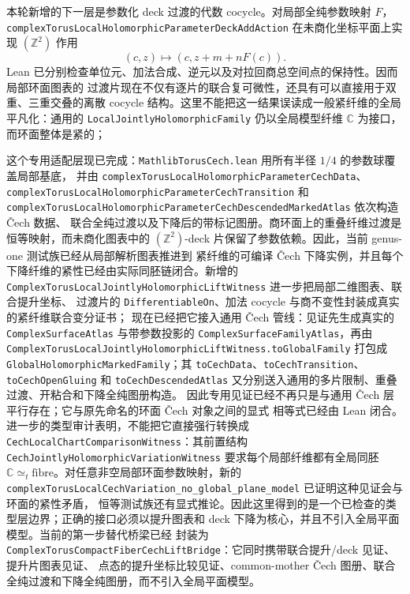 \documentclass[UTF8,fontset=none,a4paper,11pt]{ctexart}
\begin{document}
本轮新增的下一层是参数化 deck 过渡的代数 cocycle。对局部全纯参数映射 $F$，
\texttt{complexTorusLocalHolomorphicParameterDeckAddAction} 在未商化坐标平面上实现
\((\mathbb Z^2)\) 作用
\[
 (c,z)\longmapsto(c,z+m+nF(c)).
\]
Lean 已分别检查单位元、加法合成、逆元以及对拉回商总空间点的保持性。因而局部环面图表的
过渡片现在不仅有逐片的联合复可微性，还具有可以直接用于双重、三重交叠的离散 cocycle
结构。这里不能把这一结果误读成一般紧纤维的全局平凡化：通用的
\texttt{LocalJointlyHolomorphicFamily} 仍以全局模型纤维 \(\mathbb C\) 为接口，而环面整体是紧的；
\begin{sloppypar}
这个专用适配层现已完成：\texttt{MathlibTorusCech.lean} 用所有半径 $1/4$ 的参数球覆盖局部基底，
并由 \texttt{complexTorusLocalHolomorphicParameterCechData}、
\texttt{complexTorusLocalHolomorphicParameterCechTransition} 和
\texttt{complexTorusLocalHolomorphicParameterCechDescendedMarkedAtlas} 依次构造 Čech 数据、
联合全纯过渡以及下降后的带标记图册。商环面上的重叠纤维过渡是恒等映射，而未商化图表中的
\((\mathbb Z^2)\)-deck 片保留了参数依赖。因此，当前 genus-one 测试族已经从局部解析图表推进到
紧纤维的可编译 Čech 下降实例，并且每个下降纤维的紧性已经由实际同胚链闭合。新增的
\texttt{ComplexTorusLocalJointlyHolomorphicLiftWitness} 进一步把局部二维图表、联合提升坐标、
过渡片的 \texttt{DifferentiableOn}、加法 cocycle 与商不变性封装成真实的紧纤维联合变分证书；
现在已经把它接入通用 Čech 管线：见证先生成真实的
\texttt{ComplexSurfaceAtlas} 与带参数投影的
\texttt{ComplexSurfaceFamilyAtlas}，再由
\texttt{ComplexTorusLocalJointlyHolomorphicLiftWitness.toGlobalFamily} 打包成
\texttt{GlobalHolomorphicMarkedFamily}；其
\texttt{toCechData}、\texttt{toCechTransition}、\texttt{toCechOpenGluing} 和
\texttt{toCechDescendedAtlas} 又分别送入通用的多片限制、重叠过渡、开粘合和下降全纯图册构造。
因此专用见证已经不再只是与通用 Čech 层平行存在；它与原先命名的环面 Čech 对象之间的显式
相等式已经由 Lean 闭合。进一步的类型审计表明，不能把它直接强行转换成
\texttt{CechLocalChartComparisonWitness}：其前置结构
\texttt{CechJointlyHolomorphicVariationWitness} 要求每个局部纤维都有全局同胚
\(\mathbb C\simeq_t\text{fibre}\)。对任意非空局部环面参数映射，新的
\texttt{complexTorusLocalCechVariation\_no\_global\_plane\_model} 已证明这种见证会与环面的紧性矛盾，
恒等测试族还有显式推论。因此这里得到的是一个已检查的类型层边界；正确的接口必须以提升图表和
deck 下降为核心，并且不引入全局平面模型。当前的第一步替代桥梁已经
封装为 \texttt{ComplexTorusCompactFiberCechLiftBridge}：它同时携带联合提升/deck 见证、提升片图表见证、
点态的提升坐标比较见证、common-mother Čech 图册、联合全纯过渡和下降全纯图册，而不引入全局平面模型。

\end{sloppypar}
\end{document}
